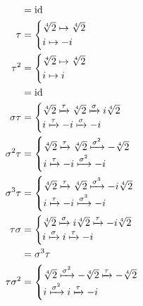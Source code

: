 \documentclass[10pt]{extarticle}
\begin{document}
\begin{enumerate}[(a)]
\begin{align*}
                     &= \text{id}\\
              \tau &= \begin{cases}
                \sqrt[4]{2} \mapsto \sqrt[4]{2}\\
                i \mapsto -i
              \end{cases}\\
                \tau^2 &= \begin{cases}
                  \sqrt[4]{2} \mapsto \sqrt[4]{2}\\
                  i\mapsto i
                \end{cases}\\
                       &= \text{id}\\
              \sigma\tau &= \begin{cases}
                \sqrt[4]{2} \xmapsto{\tau} \sqrt[4]{2} \xmapsto{\sigma} i\sqrt[4]{2}\\
                i \xmapsto{\tau} -i \xmapsto{\sigma} -i
              \end{cases}\\
            \sigma^2\tau &= \begin{cases}
              \sqrt[4]{2} \xmapsto{\tau} \sqrt[4]{2} \xmapsto{\sigma^2} -\sqrt[4]{2}\\
              i \xmapsto{\tau} -i \xmapsto{\sigma^2} -i
            \end{cases}\\
            \sigma^3\tau &= \begin{cases}
              \sqrt[4]{2} \xmapsto{\tau} \sqrt[4]{2} \xmapsto{\sigma^3} -i\sqrt[4]{2}\\
              i \xmapsto{\tau} -i \xmapsto{\sigma^3} -i
            \end{cases}\\
              \tau\sigma &= \begin{cases}
                \sqrt[4]{2}\xmapsto{\sigma}i\sqrt[4]{2} \xmapsto{\tau} -i\sqrt[4]{2}\\
                i\xmapsto{\sigma}i\xmapsto{\tau}-i
              \end{cases}\\
                         &= \sigma^3\tau\\
              \tau\sigma^2 &= \begin{cases}
                \sqrt[4]{2}\xmapsto{\sigma^2}-\sqrt[4]{2} \xmapsto{\tau} -\sqrt[4]{2}\\
                i\xmapsto{\sigma^2}i\xmapsto{\tau}-i

\end{cases}
\end{align*}
\end{enumerate}
\end{document}
